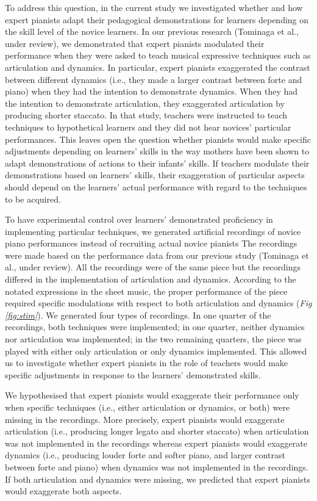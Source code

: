 \documentclass[
  man,floatsintext]{apa6}
\begin{document}
To address this question, in the current study we investigated whether and how expert pianists adapt their pedagogical demonstrations for learners depending on the skill level of the novice learners. In our previous research (Tominaga et al., under review), we demonstrated that expert pianists modulated their performance when they were asked to teach musical expressive techniques such as articulation and dynamics. In particular, expert pianists exaggerated the contrast between different dynamics (i.e., they made a larger contrast between forte and piano) when they had the intention to demonstrate dynamics. When they had the intention to demonstrate articulation, they exaggerated articulation by producing shorter staccato. In that study, teachers were instructed to teach techniques to hypothetical learners and they did not hear novices' particular performances. This leaves open the question whether pianists would make specific adjustments depending on learners' skills in the way mothers have been shown to adapt demonstrations of actions to their infants' skills. If teachers modulate their demonstrations based on learners' skills, their exaggeration of particular aspects should depend on the learners' actual performance with regard to the techniques to be acquired.

To have experimental control over learners' demonstrated proficiency in implementing particular techniques, we generated artificial recordings of novice piano performances instead of recruiting actual novice pianists The recordings were made based on the performance data from our previous study (Tominaga et al., under review). All the recordings were of the same piece but the recordings differed in the implementation of articulation and dynamics. According to the notated expressions in the sheet music, the proper performance of the piece required specific modulations with respect to both articulation and dynamics (\emph{Fig \ref{fig:stim}}). We generated four types of recordings. In one quarter of the recordings, both techniques were implemented; in one quarter, neither dynamics nor articulation was implemented; in the two remaining quarters, the piece was played with either only articulation or only dynamics implemented. This allowed us to investigate whether expert pianists in the role of teachers would make specific adjustments in response to the learners' demonstrated skills.

We hypothesised that expert pianists would exaggerate their performance only when specific techniques (i.e., either articulation or dynamics, or both) were missing in the recordings. More precisely, expert pianists would exaggerate articulation (i.e., producing longer legato and shorter staccato) when articulation was not implemented in the recordings whereas expert pianists would exaggerate dynamics (i.e., producing louder forte and softer piano, and larger contrast between forte and piano) when dynamics was not implemented in the recordings. If both articulation and dynamics were missing, we predicted that expert pianists would exaggerate both aspects.
\end{document}
